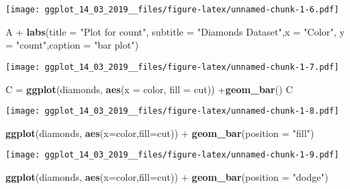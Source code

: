 \documentclass[]{article}
\newenvironment{Shaded}{\begin{snugshade}}{\end{snugshade}}
\newcommand{\KeywordTok}[1]{\textcolor[rgb]{0.13,0.29,0.53}{\textbf{{#1}}}}
\newcommand{\DataTypeTok}[1]{\textcolor[rgb]{0.13,0.29,0.53}{{#1}}}
\newcommand{\StringTok}[1]{\textcolor[rgb]{0.31,0.60,0.02}{{#1}}}
\newcommand{\NormalTok}[1]{{#1}}
\begin{document}
\texttt{[image: ggplot\_14\_03\_2019\_\_files/figure-latex/unnamed-chunk-1-6.pdf]}

\begin{Shaded}
\begin{Highlighting}[]
\NormalTok{A +}\StringTok{ }\KeywordTok{labs}\NormalTok{(}\DataTypeTok{title =} \StringTok{"Plot for count"}\NormalTok{,}
         \DataTypeTok{subtitle =} \StringTok{"Diamonds Dataset"}\NormalTok{,}\DataTypeTok{x =} \StringTok{"Color"}\NormalTok{,}
         \DataTypeTok{y =} \StringTok{"count"}\NormalTok{,}\DataTypeTok{caption =} \StringTok{"bar plot"}\NormalTok{)}
\end{Highlighting}
\end{Shaded}

\texttt{[image: ggplot\_14\_03\_2019\_\_files/figure-latex/unnamed-chunk-1-7.pdf]}

\begin{Shaded}
\begin{Highlighting}[]
\NormalTok{C =}\StringTok{ }\KeywordTok{ggplot}\NormalTok{(diamonds, }\KeywordTok{aes}\NormalTok{(}\DataTypeTok{x =} \NormalTok{color, }\DataTypeTok{fill =} \NormalTok{cut)) +}\KeywordTok{geom_bar}\NormalTok{()}
\NormalTok{C}
\end{Highlighting}
\end{Shaded}

\texttt{[image: ggplot\_14\_03\_2019\_\_files/figure-latex/unnamed-chunk-1-8.pdf]}

\begin{Shaded}
\begin{Highlighting}[]
\KeywordTok{ggplot}\NormalTok{(diamonds, }\KeywordTok{aes}\NormalTok{(}\DataTypeTok{x=}\NormalTok{color,}\DataTypeTok{fill=}\NormalTok{cut)) +}\StringTok{ }
\StringTok{  }\KeywordTok{geom_bar}\NormalTok{(}\DataTypeTok{position =} \StringTok{"fill"}\NormalTok{)}
\end{Highlighting}
\end{Shaded}

\texttt{[image: ggplot\_14\_03\_2019\_\_files/figure-latex/unnamed-chunk-1-9.pdf]}

\begin{Shaded}
\begin{Highlighting}[]
\KeywordTok{ggplot}\NormalTok{(diamonds, }\KeywordTok{aes}\NormalTok{(}\DataTypeTok{x=}\NormalTok{color,}\DataTypeTok{fill=}\NormalTok{cut)) +}\StringTok{ }
\StringTok{  }\KeywordTok{geom_bar}\NormalTok{(}\DataTypeTok{position =} \StringTok{"dodge"}\NormalTok{)}
\end{Highlighting}
\end{Shaded}
\end{document}
